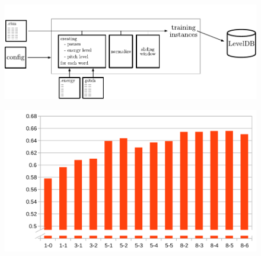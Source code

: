 \begin{figure}[ht]
    \centering
    \includegraphics[width=\textwidth]{img/overview_accoustic.pdf}
    \caption{}
    \label{fig:overview_accoustic}
\end{figure}

\begin{figure}[ht]
    \centering
    \includegraphics[width=\textwidth]{img/audio_parameter_eval.png}
    \caption{}
    \label{audio_eval}
\end{figure}